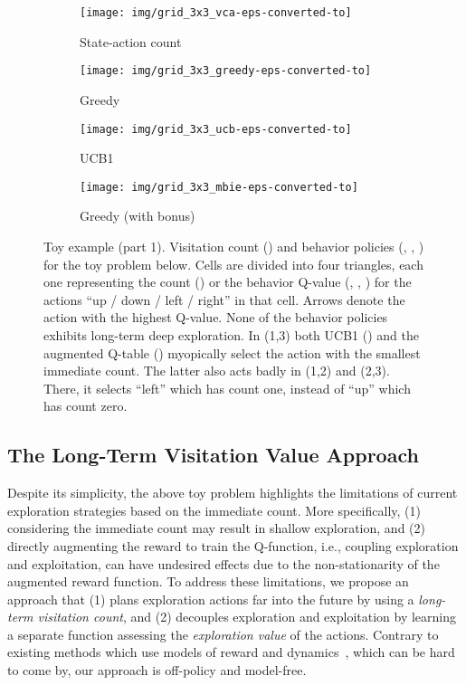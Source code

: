 \documentclass{article}
\begin{document}
\begin{figure}[t]
	\centering 
	\begin{subfigure}[t]{.24\linewidth} 
		\centering 
		\texttt{[image: img/grid\_3x3\_vca-eps-converted-to]}
		\caption{\label{fig:toy_vca}State-action count}
	\end{subfigure}
	\hfill
	\begin{subfigure}[t]{.24\linewidth} 
		\centering 
		\texttt{[image: img/grid\_3x3\_greedy-eps-converted-to]}
		\caption{\label{fig:toy_greedy}Greedy} 
	\end{subfigure} 
	\hfill
	\begin{subfigure}[t]{.24\linewidth} 
		\centering 
		\texttt{[image: img/grid\_3x3\_ucb-eps-converted-to]}
		\caption{\label{fig:toy_ucb}UCB1}
	\end{subfigure}
	\hfill
	\begin{subfigure}[t]{.24\linewidth} 
		\centering 
		\texttt{[image: img/grid\_3x3\_mbie-eps-converted-to]}
		\caption{\label{fig:toy_mbie}Greedy (with bonus)} 
	\end{subfigure} 
	\caption{\label{fig:toy_example}Toy example (part 1). Visitation count () and behavior policies (, , ) for the toy problem below. Cells are divided into four triangles, each one representing the count () or the behavior Q-value (, , ) for the actions ``up / down / left / right'' in that cell. Arrows denote the action with the highest Q-value. None of the behavior policies exhibits long-term deep exploration. In (1,3) both UCB1 () and the augmented Q-table () myopically select the action with the smallest immediate count. The latter also acts badly in (1,2) and (2,3). There, it selects ``left'' which has count one, instead of ``up'' which has count zero.}
\end{figure}

\subsection{The Long-Term Visitation Value Approach}
\label{ssec:vv}
Despite its simplicity, the above toy problem highlights the limitations of current exploration strategies based on the immediate count. More specifically, (1) considering the immediate count may result in shallow exploration, and (2) directly augmenting the reward to train the Q-function, i.e., coupling exploration and exploitation, can have undesired effects due to the non-stationarity of the augmented reward function.
To address these limitations, we propose an approach that (1) plans exploration actions far into the future by using a \textit{long-term visitation count}, and (2) decouples exploration and exploitation by learning a separate function assessing the \textit{exploration value} of the actions. 
Contrary to existing methods which use models of reward and dynamics~\citep{hester2013texplore}, which can be hard to come by, our approach is off-policy and model-free. 
\end{document}
